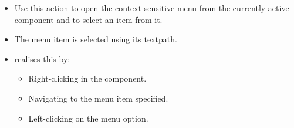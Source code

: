 
\begin{itemize}
\item Use this action to open the context-sensitive menu from the currently active component and to select an item from it.
\item The menu item is selected using its textpath. 
\item \gd{} realises this by:
\begin{itemize}
\item Right-clicking in the component.
\item Navigating to the menu item specified.
\item Left-clicking on the menu option.  
\end{itemize}


\end{itemize}

  

  
